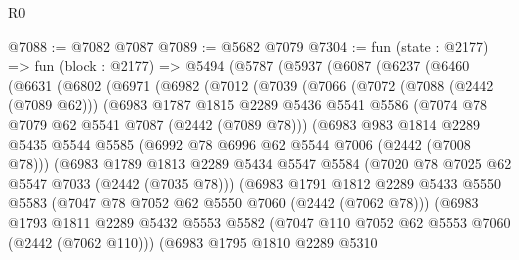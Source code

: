 \begin{lexlean}{R0}
\begin{coremodule}
@7088 := @7082 @7087
@7089 := @5682 @7079
@7304 := fun (state : @2177) =>
  fun (block : @2177) =>
  @5494
    (@5787
      (@5937
        (@6087
          (@6237
            (@6460
              (@6631
                (@6802
                  (@6971
                    (@6982
                      (@7012
                        (@7039
                          (@7066
                            (@7072
                              (@7088 (@2442 (@7089 @62)))
                              (@6983
                                @1787
                                @1815
                                @2289
                                @5436
                                @5541
                                @5586
                                (@7074 @78 @7079 @62 @5541 @7087 (@2442 (@7089 @78)))
                                (@6983
                                  @983
                                  @1814
                                  @2289
                                  @5435
                                  @5544
                                  @5585
                                  (@6992 @78 @6996 @62 @5544 @7006 (@2442 (@7008 @78)))
                                  (@6983
                                    @1789
                                    @1813
                                    @2289
                                    @5434
                                    @5547
                                    @5584
                                    (@7020 @78 @7025 @62 @5547 @7033 (@2442 (@7035 @78)))
                                    (@6983
                                      @1791
                                      @1812
                                      @2289
                                      @5433
                                      @5550
                                      @5583
                                      (@7047 @78 @7052 @62 @5550 @7060 (@2442 (@7062 @78)))
                                      (@6983
                                        @1793
                                        @1811
                                        @2289
                                        @5432
                                        @5553
                                        @5582
                                        (@7047 @110 @7052 @62 @5553 @7060 (@2442 (@7062 @110)))
                                        (@6983
                                          @1795
                                          @1810
                                          @2289
                                          @5310

\end{coremodule}
\end{lexlean}
